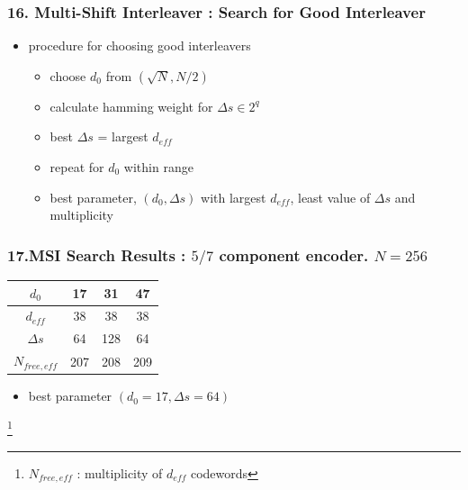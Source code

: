 \documentclass{beamer}  %
\newcommand\blfootnote[1]{%
  \begingroup
  \renewcommand\thefootnote{}\footnote{#1}%
  \addtocounter{footnote}{-1}%
  \endgroup
}
\begin{document}
\begin{frame}
\frametitle{16. Multi-Shift Interleaver : Search for Good Interleaver}

\begin{itemize}


\item procedure for choosing good interleavers

\begin{itemize}
\setlength\itemsep{2em}
\item choose $d_0$ from $(\sqrt{N},N/2)$

\item calculate hamming weight for  $\Delta s \in 2^q$



\item best $\Delta s$ = largest $d_{eff}$



\item repeat for $d_0$ within range 

\item best parameter, $(d_0, \Delta s)$ with  largest $d_{eff}$, least value of $\Delta s$ and multiplicity
\end{itemize}



\end{itemize}

\end{frame}

\begin{frame}
\frametitle{17.MSI Search Results : $5/7$ component encoder. $N=256$}
\begin{table}[h!]
\centering
\begin{tabular}{||c |c |c |c||} 
 \hline
 $d_0$ & 17 & 31 & 47 \\ [0.5ex] 
 \hline\hline
  $d_{eff}$ & 38 & 38 & 38 \\ 
 \hline
 $\Delta s$ & 64 & 128 & 64 \\ 
  \hline
  $N_{free, eff}$ & 207 & 208 & 209 \\ [1ex] 
 \hline
\end{tabular}
\label{tab1}
\end{table}

\begin{itemize}
\item best parameter $(d_0=17,\Delta s = 64)$
\end{itemize}
\blfootnote{ $N_{free, eff}$ : multiplicity of $d_{eff} $ codewords}
\end{frame}
\end{document}
